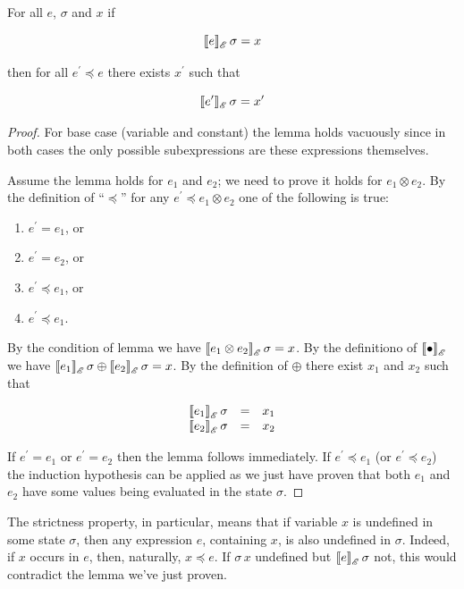 \begin{lemma}[Strictness]
  For all $e$, $\sigma$ and $x$ if

  \[
  \sembr{e}^\ph_\mathscr{E}\,\sigma=x
  \]

  then for all $e^\prime\preceq e$ there exists $x^\prime$ such that

  \[
  \sembr{e^\prime}^\ph_\mathscr{E}\,\sigma=x^\prime
  \]
\end{lemma}
\begin{proof}
  For base case (variable and constant) the lemma holds vacuously since in both cases
  the only possible subexpressions are these expressions themselves.

  Assume the lemma holds for $e_1$ and $e_2$; we need to prove it holds for $e_1\otimes e_2$.
  By the definition of ``$\preceq$'' for any $e^\prime\preceq e_1\otimes e_2$ one of the
  following is true:

  \begin{enumerate}
  \item $e^\prime=e_1$, or
  \item $e^\prime=e_2$, or
  \item $e^\prime\preceq e_1$, or
  \item $e^\prime\preceq e_1$.
  \end{enumerate}

  By the condition of lemma we have $\sembr{e_1\otimes e_2}^\ph_\mathscr{E}\,\sigma=x$.
  By the definitiono of $\sembr{\bullet}^\ph_\mathscr{E}$ we have $\sembr{e_1}^\ph_\mathscr{E}\,\sigma\oplus\sembr{e_2}^\ph_\mathscr{E}\,\sigma=x$.
  By the definition of $\oplus$ there exist $x_1$ and $x_2$ such that

  \[
  \begin{array}{rcl}
    \sembr{e_1}^\ph_\mathscr{E}\,\sigma&=&x_1\\
    \sembr{e_2}^\ph_\mathscr{E}\,\sigma&=&x_2
  \end{array}
  \]

  If $e^\prime=e_1$ or $e^\prime=e_2$ then the lemma follows immediately.
  If $e^\prime\preceq e_1$ (or $e^\prime\preceq e_2$) the induction hypothesis can be applied as we just have proven that
  both $e_1$ and $e_2$ have some values being evaluated in the state $\sigma$.
\end{proof}

The strictness property, in particular, means that if variable $x$ is undefined in some state $\sigma$, then
any expression $e$, containing $x$, is also undefined in $\sigma$. Indeed, if $x$ occurs in $e$, then, naturally,
$x\preceq e$. If $\sigma\,x$ undefined but $\sembr{e}^\ph_\mathscr{E}\,\sigma$ not, this would contradict
the lemma we've just proven.

